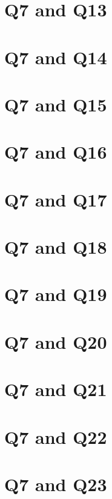 \documentclass{report}
\begin{document}
\clearpage
\section{Q7 and Q13}


\clearpage
\section{Q7 and Q14}


\clearpage
\section{Q7 and Q15}


\clearpage
\section{Q7 and Q16}


\clearpage
\section{Q7 and Q17}


\clearpage
\section{Q7 and Q18}


\clearpage
\section{Q7 and Q19}


\clearpage
\section{Q7 and Q20}


\clearpage
\section{Q7 and Q21}


\clearpage
\section{Q7 and Q22}


\clearpage
\section{Q7 and Q23}

\end{document}
